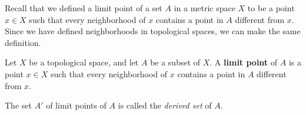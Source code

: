 \begin{comment}

\ActivitySolution

\ba

\item If $C$ is closed, then $C$ is the complement of some open set $O$. That is, $C = \Z \setminus O$ is finite. 

\item Since $\bigcup_{n \geq 3} C_n = \{n \in \Z \mid n \geq 2\}$ is an infinite set, we can see that the union of all of the $C_n$ is not a closed set in $(\Z, \tau_{FC})$. We conclude that arbitrary unions of closed sets need not be closed. 

\ea

\end{comment}

\label{sec_limit_points}

Recall that we defined a limit point of a set $A$ in a metric space $X$ to be a point $x \in X$ such that every neighborhood of $x$ contains a point in $A$ different from $x$. Since we have defined neighborhoods in topological spaces, we can make the same definition. 

\begin{definition} Let $X$ be a topological space, and let $A$ be a subset of $X$. A \textbf{limit point} of $A$ is a point $x \in X$ such that every neighborhood of $x$ contains a point in $A$ different from $x$. 
\end{definition}

The set $A'$ of limit points of $A$ is called the \emph{derived set} of $A$. 

